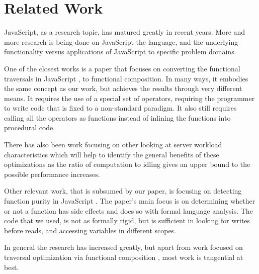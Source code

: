 \chapter{Related Work}

JavaScript, as a research topic, has matured greatly in recent years.  More and more research is being done on JavaScript the language, and the underlying functionality versus applications of JavaScript to specific problem domains.

One of the closest works is a paper that focuses on converting the functional traversals in JavaScript \cite{combinators15}, to functional composition.  In many ways, it embodies the same concept as our work, but achieves the results through very different means.  It requires the use of a special set of operators, requiring the programmer to write code that is fixed to a non-standard paradigm. It also still requires calling all the operators as functions instead of inlining the functions into procedural code.

There has also been work focusing on other looking at server workload characteristics \cite{workload14} which will help to identify the general benefits of these optimizations as the ratio of computation to idling gives an upper bound to the possible performance increases.

Other relevant work, that is subsumed by our paper, is focusing on detecting function purity in JavaScript \cite{purity15}.  The paper's main focus is on determining whether or not a function has side effects and does so with formal language analysis.  The code that we used, is not as formally rigid, but is sufficient in looking for writes before reads, and accessing variables in different scopes.  

In general the research has increased greatly, but apart from work focused on traversal optimization via functional composition \cite{combinators15}, most work is tangential at best.